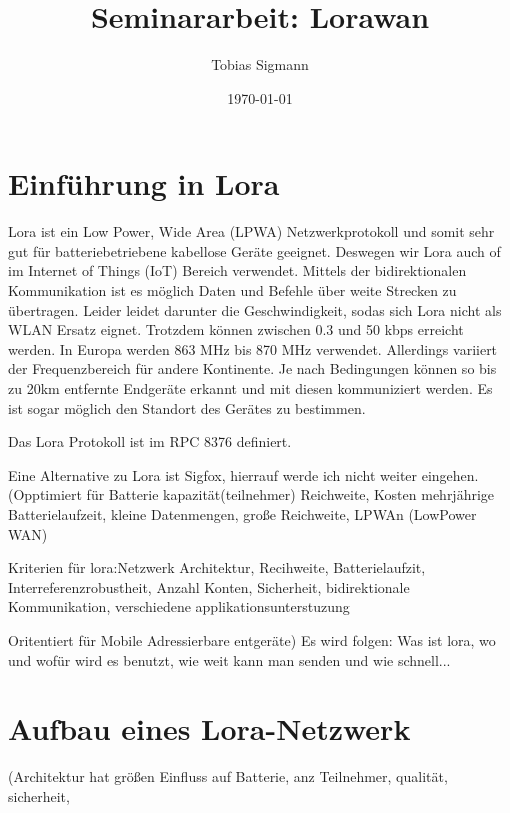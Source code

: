\documentclass[a4paper,12pt]{article}
\author{Tobias Sigmann}
\title{Seminararbeit: Lorawan}
\date{\today}
\begin{document}
    \maketitle
    \tableofcontents
    \newpage
    \begin{abstract} 
       \cite{WhatIsLoRa}
       \newline
       \cite{Semtech}
    \end{abstract}

    \section{Einführung in Lora}
    Lora ist ein Low Power, Wide Area (LPWA) Netzwerkprotokoll und somit sehr gut für batteriebetriebene kabellose Geräte geeignet. Deswegen wir Lora auch of im Internet of Things (IoT) Bereich verwendet.
    Mittels der bidirektionalen Kommunikation ist es möglich Daten und Befehle über weite Strecken zu übertragen. Leider leidet darunter die Geschwindigkeit, sodas sich Lora nicht als WLAN Ersatz eignet.
    Trotzdem können zwischen 0.3 und 50 kbps erreicht werden. In Europa werden 863 MHz bis 870 MHz verwendet. Allerdings variiert der Frequenzbereich für andere Kontinente. Je nach Bedingungen können so bis zu 20km entfernte Endgeräte erkannt und mit diesen kommuniziert werden.
    Es ist sogar möglich den Standort des Gerätes zu bestimmen.

    Das Lora Protokoll ist im RPC 8376 definiert.
    
    Eine Alternative zu Lora ist Sigfox, hierrauf werde ich nicht weiter eingehen.
    \newline    
    \cite{WhatIsLoRa}(Opptimiert für Batterie kapazität(teilnehmer) Reichweite, Kosten
    mehrjährige Batterielaufzeit, kleine Datenmengen, große Reichweite, LPWAn (LowPower WAN)
    
    Kriterien für lora:Netzwerk Architektur, Recihweite, Batterielaufzit, Interreferenzrobustheit, Anzahl Konten, Sicherheit, bidirektionale Kommunikation, verschiedene applikationsunterstuzung
    
    Oritentiert für Mobile Adressierbare entgeräte)
    \newline{}
        \cite{LoraLimit}
    \newline{}\newline{} Es wird folgen: Was ist lora, wo und wofür wird es benutzt, wie weit kann man senden und wie schnell...
    \section{Aufbau eines Lora-Netzwerk}
    \cite{WhatIsLoRa}(Architektur hat größen Einfluss auf Batterie, anz Teilnehmer, qualität, sicherheit,
    
\end{document}
